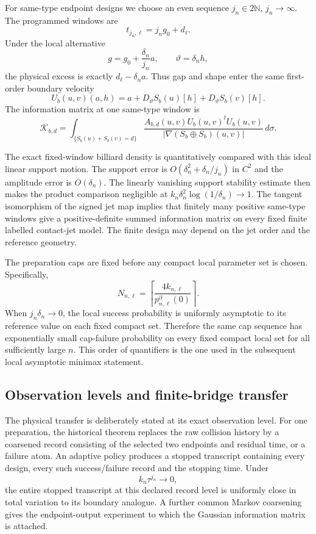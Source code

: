 For same-type endpoint designs we choose an even sequence
$j_n\in2\mathbb N$, $j_n\to\infty$.  The programmed windows are
\[
                         t_{j_n,\ell}=j_ng_0+d_\ell.
\]
Under the local alternative
\begin{equation}\label{eq:intro-v22-multirate}
 g=g_0+\frac{\delta_n}{j_n}a,
 \qquad
 \vartheta=\delta_nh,
\end{equation}
the physical excess is exactly $d_\ell-\delta_na$.  Thus gap and shape enter
the same first-order boundary velocity
\[
 U_b(u,v)(a,h)=a+D_\vartheta S_b(u)[h]+D_\vartheta S_b(v)[h].
\]
The information matrix at one same-type window is
\begin{equation}\label{eq:intro-v22-physical-information}
 \mathcal K_{b,d}
 =\int_{\{S_b(u)+S_b(v)=d\}}
 \frac{A_{b,d}(u,v)U_b(u,v)^tU_b(u,v)}
 {|\nabla(S_b\oplus S_b)(u,v)|}\,d\sigma.
\end{equation}

The exact fixed-window billiard density is quantitatively compared with this
ideal linear support motion.  The support error is
$O(\delta_n^2+\delta_n/j_n)$ in $C^2$ and the amplitude error is
$O(\delta_n)$.  The linearly vanishing support stability estimate then makes
the product comparison negligible at
$k_n\delta_n^2\log(1/\delta_n)\to1$.  The tangent isomorphism of the signed
jet map implies that finitely many positive same-type windows give a
positive-definite summed information matrix on every fixed finite labelled
contact-jet model.  The finite design may depend on the jet order and the
reference geometry.

The preparation caps are fixed before any compact local parameter set is
chosen.  Specifically,
\[
 N_{n,\ell}=\left\lceil
 \frac{4k_{n,\ell}}{p^\partial_{n,\ell}(0)}\right\rceil.
\]
When $j_n\delta_n\to0$, the local success probability is uniformly
asymptotic to its reference value on each fixed compact set.  Therefore the
same cap sequence has exponentially small cap-failure probability on every
fixed compact local set for all sufficiently large $n$.  This order of
quantifiers is the one used in the subsequent local asymptotic minimax
statement.

\subsection{Observation levels and finite-bridge transfer}

The physical transfer is deliberately stated at its exact observation level.
For one preparation, the historical theorem replaces the raw collision
history by a coarsened record consisting of the selected two endpoints and
residual time, or a failure atom.  An adaptive policy produces a stopped
transcript containing every design, every such success/failure record and the
stopping time.  Under
\[
                         k_n\tau^{j_n}\longrightarrow0,
\]
the entire stopped transcript at this declared record level is uniformly
close in total variation to its boundary analogue.  A further common Markov
coarsening gives the endpoint-output experiment to which the Gaussian
information matrix is attached.

